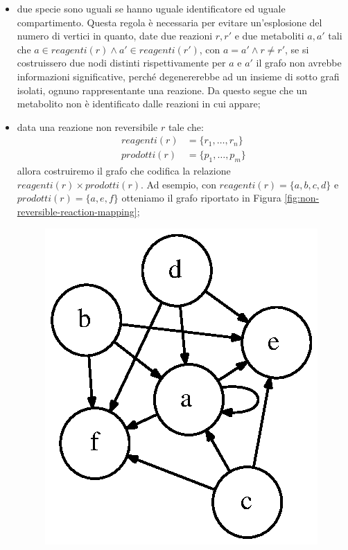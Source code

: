 \begin{itemize}
\item due specie sono uguali se hanno uguale identificatore ed uguale
  compartimento. Questa regola \`e necessaria per evitare
  un'esplosione del numero di vertici in quanto, date due reazioni $r,
  r'$ e due metaboliti $a, a'$ tali che $a \in reagenti(r) \wedge a'
  \in reagenti(r')$, con $a = a' \wedge r \not = r'$, se si
  costruissero due nodi distinti rispettivamente per $a$ e $a'$ il
  grafo non avrebbe informazioni significative, perch\'e degenererebbe
  ad un insieme di sotto grafi isolati, ognuno rappresentante una
  reazione. Da questo segue che un metabolito non \`e identificato
  dalle reazioni in cui appare;
\item data una reazione non reversibile $r$ tale che:
  \begin{displaymath}
    \begin{split} 
      reagenti(r) &= \{ r_{1}, \ldots, r_{n} \} \\
      prodotti(r) &= \{ p_{1}, \ldots, p_{m} \}
    \end{split}
  \end{displaymath}
  allora costruiremo il grafo che codifica la relazione $reagenti(r)
  \times prodotti(r)$. Ad esempio, con $reagenti(r) = \{ a, b, c, d
  \}$ e $prodotti(r) = \{a, e, f\}$ otteniamo il grafo riportato in
  Figura \ref{fig:non-reversible-reaction-mapping};
  \begin{figure}
    \centering
    \includegraphics{images/non-reversible-reaction-example.dot.eps}

\end{figure}
\end{itemize}

